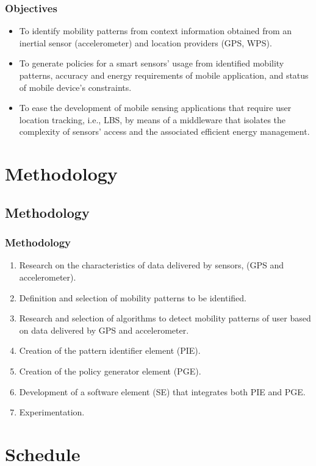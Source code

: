 \documentclass[compress,9pt,xcolor={dvipsnames,table}]{beamer}
\begin{document}
\begin{frame}\frametitle{Objectives}
\begin{tcolorbox}[title=Particular objectives,colframe=PineGreen]
\small
\begin{itemize}
  \item To identify mobility patterns from context information obtained from an inertial sensor (accelerometer) and location providers (GPS, WPS).
  \item To generate policies for a smart sensors' usage from identified mobility patterns, accuracy and energy requirements of mobile application, and status of mobile device's constraints. 
  \item To ease the development of mobile sensing applications that require user location tracking, i.e., LBS, by means of a middleware that isolates the complexity of sensors' access and the associated efficient energy management.
\end{itemize}
\end{tcolorbox}
\end{frame}


\section{Methodology}
\subsection{Methodology}
\begin{frame}\frametitle{Methodology}
\begin{enumerate}
  \item Research on the characteristics of data delivered by sensors, (GPS and accelerometer).
  \item Definition and selection of mobility patterns to be identified.
  \item Research and selection of algorithms to detect mobility patterns of user based on data delivered by GPS and accelerometer.
  \item Creation of the pattern identifier element (PIE).
  \item Creation of the policy generator element (PGE).
  \item Development of a software element (SE) that integrates both PIE and PGE.
  \item Experimentation.
\end{enumerate}
\end{frame}


\section{Schedule}
\end{document}
